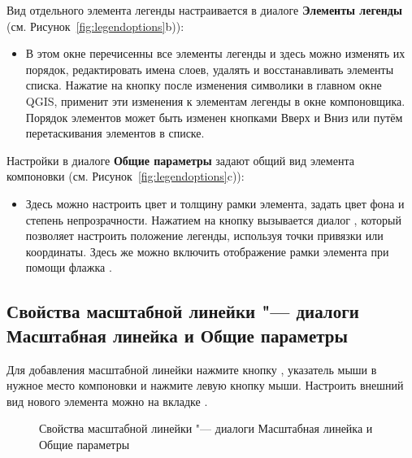 
Вид отдельного элемента легенды настраивается в диалоге
\textbf{Элементы легенды} (см. Рисунок~\ref{fig:legendoptions}b)):

\begin{itemize}[label=--]
\item В этом окне перечисенны все элементы легенды и здесь можно
изменять их порядок, редактировать имена слоев, удалять и восстанавливать
элементы списка. Нажатие на кнопку  после изменения
символики в главном окне QGIS, применит эти изменения к элементам
легенды в окне компоновщика. Порядок элементов может быть изменен
кнопками Вверх и Вниз или путём перетаскивания элементов в списке.
\end{itemize}


Настройки в диалоге \textbf{Общие параметры} задают общий вид
элемента компоновки (см. Рисунок~\ref{fig:legendoptions}c)):

\begin{itemize}[label=--]
\item Здесь можно настроить цвет и толщину рамки элемента, задать
цвет фона и степень непрозрачности. Нажатием на кнопку
 вызывается диалог ,
который позволяет настроить положение легенды, используя точки привязки
или координаты. Здесь же можно включить отображение рамки элемента при
помощи флажка .
\end{itemize}

\subsection{Свойства масштабной линейки "--- диалоги Масштабная линейка и Общие параметры}

Для добавления масштабной линейки нажмите кнопку
, указатель
мыши в нужное место компоновки и нажмите левую кнопку мыши. Настроить
внешний вид нового элемента можно на вкладке .

\begin{figure}[ht]
\centering
{}
\hspace{1cm}
\caption{Свойства масштабной линейки "--- диалоги Масштабная линейка и Общие параметры \wincaption}\label{fig:scalebaroptions}
\end{figure}

